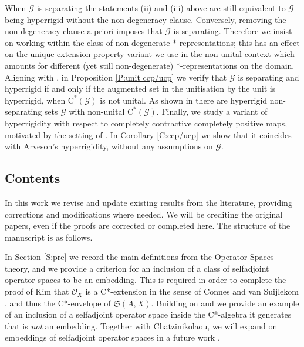 \documentclass[11pt, draft]{amsart}
\numberwithin{equation}{section}
\theoremstyle{plain}
\theoremstyle{definition}
\theoremstyle{remark}
\newcommand{\G}{{\mathcal{G}}}
\renewcommand{\O}{{\mathcal{O}}}
\newcommand{\fS}{{\mathfrak{S}}}
\newcommand{\ca}{\mathrm{C}^*}
\begin{document}
When $\G$ is separating the statements (ii) and (iii) above are still equivalent to $\G$ being hyperrigid without the non-degeneracy clause.
Conversely, removing the non-degeneracy clause a priori imposes that $\G$ is separating.
Therefore we insist on working within the class of non-degenerate $*$-representations; this has an effect on the unique extension property variant we use in the non-unital context which amounts for different (yet still non-degenerate) $*$-representations on the domain.
Aligning with \cite{Sal17}, in Proposition \ref{P:unit ccp/ucp} we verify that $\G$ is separating and hyperrigid if and only if the augmented set in the unitisation by the unit is hyperrigid, when $\ca(\G)$ is not unital.
As shown in \cite{Sal17} there are hyperrigid non-separating sets $\G$ with non-unital $\ca(\G)$.
Finally, we study a variant of hyperrigidity with respect to completely contractive completely positive maps, motivated by the setting of \cite[Lemma 2.7]{Sal17}.
In Corollary \ref{C:ccp/ucp} we show that it coincides with Arveson's hyperrigidity, without any assumptions on $\G$.

\subsection{Contents}

In this work we revise and update existing results from the literature, providing corrections and modifications where needed. 
We will be crediting the original papers, even if the proofs are corrected or completed here.
The structure of the manuscript is as follows.

In Section \ref{S:pre} we record the main definitions from the Operator Spaces theory, and we provide a criterion for an inclusion of a class of selfadjoint operator spaces to be an embedding.
This is required in order to complete the proof of Kim \cite[Proposition 2.6]{Kim21} that $\O_X$ is a C*-extension in the sense of Connes and van Suijlekom \cite{CS21}, and thus the C*-envelope of $\fS(A,X)$.
Building on \cite[Example 2.14]{KKM23} and \cite[Example 4.1]{Rus23} we provide an example of an inclusion of a selfadjoint operator space inside the C*-algebra it generates that is \emph{not} an embedding. Together with Chatzinikolaou, we will expand on embeddings of selfadjoint operator spaces in a future work \cite{CDKP24}.
\end{document}
